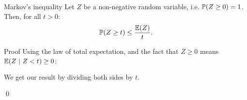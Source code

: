 \documentclass[a4paper]{article}
\begin{document}
\begin{parag}{Markov's inequality}
    Let $Z$ be a non-negative random variable, i.e. $\prob\left(Z \geq 0\right) = 1$. Then, for all $t > 0$: 
    \[\prob\left(Z \geq t\right) \leq \frac{\exval\left(Z\right)}{t}.\]

    \begin{subparag}{Proof}
        Using the law of total expectation, and the fact that $Z \geq 0$ means $\exval\left(Z \suchthat Z < t\right) \geq 0$:
        
        We get our result by dividing both sides by $t$.

        \qed
    \end{subparag}
\end{parag}
\end{document}
